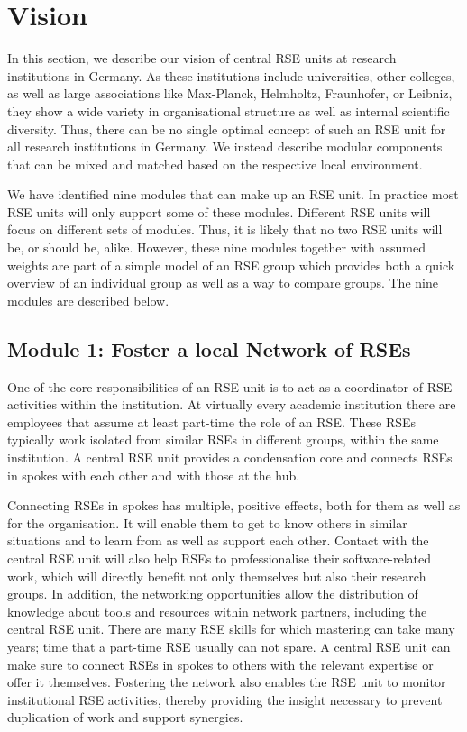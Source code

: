\documentclass[a4paper]{article}
\begin{document}
\section{Vision}%
\label{sec:vision}
In this section, we describe our vision of central RSE units at research institutions in Germany.
As these institutions include universities, other colleges, as well as large associations like Max-Planck, Helmholtz, Fraunhofer, or Leibniz,
they show a wide variety in organisational structure as well as internal scientific diversity.
Thus, there can be no single optimal concept of such an RSE unit for all research institutions in Germany.
We instead describe modular components that can be mixed and matched based on the respective local environment.

We have identified nine modules that can make up an RSE unit.
In practice most RSE units will only support some of these modules.
Different RSE units will focus on different sets of modules.
Thus, it is likely that no two RSE units will be, or should be, alike.
However, these nine modules together with assumed weights are part of a simple model of an RSE group which provides both a quick overview of an individual group as well as a way to compare groups.
The nine modules are described below.

\subsection{Module 1: Foster a local Network of RSEs}%
\label{sec:network}

One of the core responsibilities of an RSE unit is to act as a coordinator of RSE activities within the institution.
At virtually every academic institution there are employees that assume at least part-time the role of an RSE.
These RSEs typically work isolated from similar RSEs in different groups, within the same institution.
A central RSE unit provides a condensation core and connects RSEs in spokes with each other and with those at the hub.

Connecting RSEs in spokes has multiple, positive effects, both for them as well as for the organisation.
It will enable them to get to know others in similar situations and to learn from as well as support each other.
Contact with the central RSE unit will also help RSEs to professionalise their software-related work, which will directly benefit not only themselves but also their research groups.
In addition, the networking opportunities allow the distribution of knowledge about tools and resources within network partners, including the central RSE unit.
There are many RSE skills for which mastering can take many years; time that a part-time RSE usually can not spare.
A central RSE unit can make sure to connect RSEs in spokes to others with the relevant expertise or offer it themselves.
Fostering the network also enables the RSE unit to monitor institutional RSE activities, thereby providing the insight necessary to prevent duplication of work and support synergies.
\end{document}
